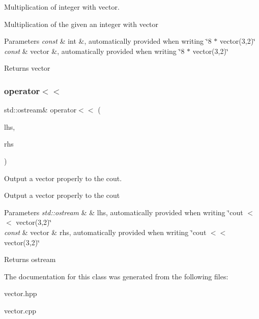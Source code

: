 Multiplication of integer with vector. 

Multiplication of the given an integer with vector 
\begin{DoxyParams}{Parameters}
{\em const} & int \&, automatically provided when writing \char`\"{}8 $\ast$ vector(3,2)\char`\"{} \\
\hline
{\em const} & vector \&, automatically provided when writing \char`\"{}8 $\ast$ vector(3,2)\char`\"{} \\
\hline
\end{DoxyParams}
\begin{DoxyReturn}{Returns}
vector 
\end{DoxyReturn}
\mbox{\label{classvector_a7a6813f75dabd6f9575f9d6f91890255}} 
\subsubsection{\texorpdfstring{operator$<$$<$}{operator<<}}
{\footnotesize\ttfamily std\+::ostream\& operator$<$$<$ (\begin{DoxyParamCaption}\item[{std\+::ostream \&}]{lhs,  }\item[{const \hyperlink{classvector}{vector} \&}]{rhs }\end{DoxyParamCaption})\hspace{0.3cm}{\ttfamily [friend]}}



Output a vector properly to the cout. 

Output a vector properly to the cout 
\begin{DoxyParams}{Parameters}
{\em std\+::ostream} & \& lhs, automatically provided when writing \char`\"{}cout $<$$<$ vector(3,2)\char`\"{} \\
\hline
{\em const} & vector \& rhs, automatically provided when writing \char`\"{}cout $<$$<$ vector(3,2)\char`\"{} \\
\hline
\end{DoxyParams}
\begin{DoxyReturn}{Returns}
ostream 
\end{DoxyReturn}


The documentation for this class was generated from the following files\+:\begin{DoxyCompactItemize}
\item 
vector.\+hpp\item 
vector.\+cpp\end{DoxyCompactItemize}
